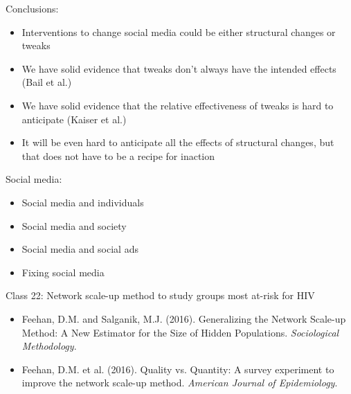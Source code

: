 \documentclass[aspectratio=169]{beamer}
\begin{document}
\begin{frame}

Conclusions:
\begin{itemize}
\item Interventions to change social media could be either structural changes or tweaks \pause
\item We have solid evidence that tweaks don't always have the intended effects (Bail et al.) \pause
\item We have solid evidence that the relative effectiveness of tweaks is hard to anticipate (Kaiser et al.) \pause
\item It will be even hard to anticipate all the effects of structural changes, but that does not have to be a recipe for inaction
\end{itemize}

\end{frame}
\begin{frame}

Social media:
\begin{itemize}
\item Social media and individuals
\item Social media and society
\item Social media and social ads
\item Fixing social media
\end{itemize}

\end{frame}
\begin{frame}

Class 22: Network scale-up method to study groups most at-risk for HIV 
\begin{itemize}
\item Feehan, D.M. and Salganik, M.J. (2016). Generalizing the Network Scale-up Method: A New Estimator for the Size of Hidden Populations. \textit{Sociological Methodology}.
\item Feehan, D.M. et al. (2016). Quality vs. Quantity: A survey experiment to improve the network scale-up method. \textit{American Journal of Epidemiology}. 
\end{itemize}

\end{frame}
\end{document}
